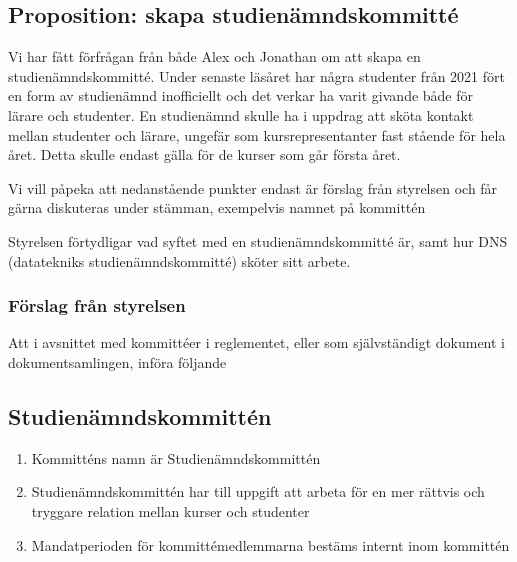 \documentclass[protokoll]{dvd}
\begin{document}
\subsection{Proposition: skapa studienämndskommitté}
Vi har fått förfrågan från både Alex och Jonathan om att skapa en studienämndskommitté.
Under senaste läsåret har några studenter från 2021 fört en form av studienämnd inofficiellt och det verkar ha varit givande både för lärare och studenter.
En studienämnd skulle ha i uppdrag att sköta kontakt mellan studenter och lärare, ungefär som kursrepresentanter fast stående för hela året.
Detta skulle endast gälla för de kurser som går första året.

Vi vill påpeka att nedanstående punkter endast är förslag från styrelsen och får gärna diskuteras under stämman, exempelvis namnet på kommittén

Styrelsen förtydligar vad syftet med en studienämndskommitté är, samt hur DNS (datatekniks studienämndskommitté) sköter sitt arbete.

    \subsubsection*{Förslag från styrelsen}

        \begin{attsatser}
        \item Att i avsnittet med kommittéer i reglementet, eller som självständigt dokument i dokumentsamlingen, införa följande
        \begin{displayquote}
            \subsection*{Studienämndskommittén}
            \begin{enumerate}[label=\arabic* §]
                \item Kommitténs namn är Studienämndskommittén

                \item Studienämndskommittén har till uppgift att arbeta för en mer rättvis och tryggare relation mellan kurser och studenter

                \item Mandatperioden för kommittémedlemmarna bestäms internt inom kommittén
            \end{enumerate}
        \end{displayquote}
    \end{attsatser}
\end{document}
